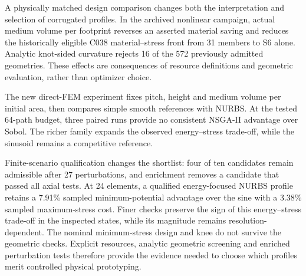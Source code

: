 A physically matched design comparison changes both the interpretation and selection of corrugated profiles. In the archived nonlinear campaign, actual medium volume per footprint reverses an asserted material saving and reduces the historically eligible C038 material--stress front from 31 members to S6 alone. Analytic knot-sided curvature rejects 16 of the 572 previously admitted geometries. These effects are consequences of resource definitions and geometric evaluation, rather than optimizer choice.

The new direct-FEM experiment fixes pitch, height and medium volume per initial area, then compares simple smooth references with NURBS. At the tested 64-path budget, three paired runs provide no consistent NSGA-II advantage over Sobol. The richer family expands the observed energy--stress trade-off, while the sinusoid remains a competitive reference.

Finite-scenario qualification changes the shortlist: four of ten candidates remain admissible after 27 perturbations, and enrichment removes a candidate that passed all axial tests. At 24 elements, a qualified energy-focused NURBS profile retains a 7.91\% sampled minimum-potential advantage over the sine with a 3.38\% sampled maximum-stress cost. Finer checks preserve the sign of this energy--stress trade-off in the inspected states, while its magnitude remains resolution-dependent. The nominal minimum-stress design and knee do not survive the geometric checks. Explicit resources, analytic geometric screening and enriched perturbation tests therefore provide the evidence needed to choose which profiles merit controlled physical prototyping.
